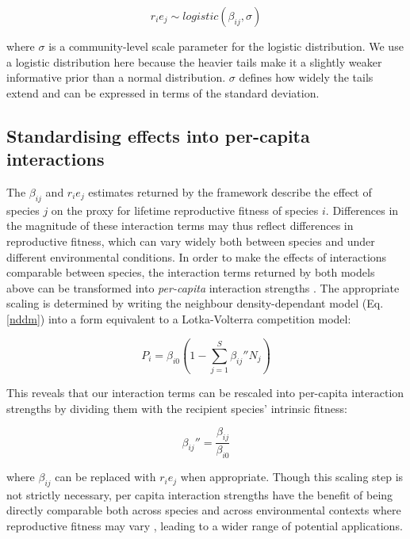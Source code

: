 \documentclass[a4,12pt]{article}
\begin{document}
        \begin{equation}
        r_i e_j \sim logistic \left ( \beta_{ij}, \sigma \right )
        \label{unrealised}
        \end{equation}
    
        where $\sigma$ is a community-level scale parameter for the logistic distribution. We use a logistic distribution here because the heavier tails make it a slightly weaker informative prior than a normal distribution. $\sigma$ defines how widely the tails extend and can be expressed in terms of the standard deviation. 

    \subsection{Standardising effects into per-capita interactions}

        The $\beta_{ij}$ and $r_i e_j$ estimates returned by the framework describe the effect of species $j$ on the proxy for lifetime reproductive fitness of species $i$. Differences in the magnitude of these interaction terms may thus reflect differences in reproductive fitness, which can vary widely both between species and under different environmental conditions. In order to make the effects of interactions comparable between species, the interaction terms returned by both models above can be transformed into \textit{per-capita} interaction strengths \parencite{Godoy2014, Bimler2018}. The appropriate scaling is determined by writing the neighbour density-dependant model (Eq. \ref{nddm}) into a form equivalent to a Lotka-Volterra competition model: 

        \begin{equation}
        P_{i} = \beta_{i0} \left ( 1 - \sum_{j=1}^{S} {\beta_{ij}}'' N_{j} \right )
        \label{LVform}
        \end{equation}

        This reveals that our interaction terms can be rescaled into per-capita interaction strengths by dividing them with the recipient species' intrinsic fitness:  

        \begin{equation}
        {\beta_{ij}}'' = \frac{\beta_{ij}}{\beta_{i0}}
        \label{scaling}
        \end{equation}

        where $\beta_{ij}$ can be replaced with $r_i e_j$ when appropriate. Though this scaling step is not strictly necessary, per capita interaction strengths have the benefit of being directly comparable both across species and across environmental contexts where reproductive fitness may vary \parencite{Wootton2005}, leading to a wider range of potential applications.
\end{document}

